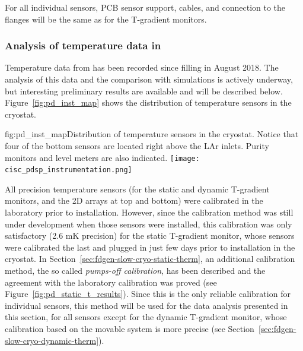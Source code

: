 For all individual sensors, PCB sensor support, cables, and connection to the flanges will be the same as for the T-gradient monitors. 
  

\subsubsection{Analysis of temperature data in }
\label{sec:fdgen-slow-cryo-temp-ana}


Temperature data from  has been recorded since  filling %
in August 2018. The analysis of this data and the comparison with  simulations is actively underway, but interesting preliminary results are available and will be described below. Figure~\ref{fig:pd_inst_map} shows the distribution of temperature sensors in the  cryostat.  

\begin{dunefigure}{fig:pd_inst_map}{Distribution of temperature sensors in the  cryostat. Notice that four of the bottom sensors are located right above the LAr inlets. Purity monitors and level meters are also indicated. }
  \texttt{[image: cisc\_pdsp\_instrumentation.png]}%
\end{dunefigure}


All precision temperature sensors (for the static and dynamic T-gradient monitors,  and the 2D arrays at top and bottom) were calibrated in the laboratory prior to installation. However, since the calibration method was still under development when those sensors 
were installed, this calibration was only satisfactory (2.6 mK precision) for the static T-gradient monitor, whose sensors were calibrated the last and  plugged in just few days prior to installation in the cryostat. In Section~\ref{sec:fdgen-slow-cryo-static-therm}, an additional calibration method, the so called {\it pumps-off calibration}, has been described and the agreement with the laboratory calibration was proved (see Figure~\ref{fig:pd_static_t_results}). Since this is the only reliable calibration for individual sensors, this method will be used for the data analysis presented in this section, for all sensors except for the dynamic T-gradient monitor, whose calibration based on the movable system is more precise (see Section~\ref{sec:fdgen-slow-cryo-dynamic-therm}). 


